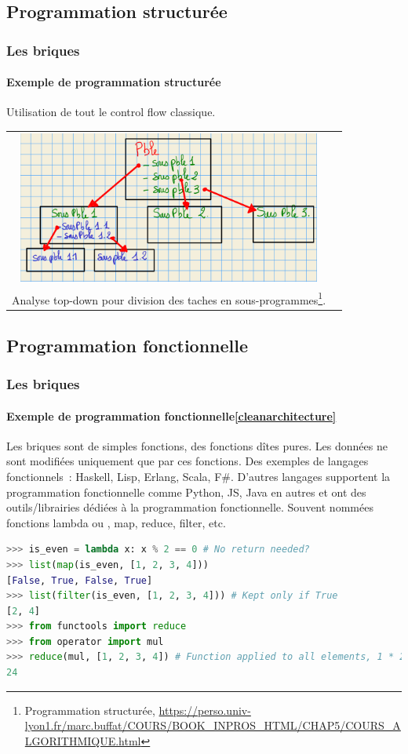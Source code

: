 \documentclass{beamer}
\begin{document}
    \subsection{Programmation structurée}\label{subsec:briques-struct}
    \begin{frame}
        \transdissolve
        \frametitle{Les briques}
        \framesubtitle{Exemple de programmation structurée}
        Utilisation de tout le control flow classique.
        \bigbreak
        \centering
        \begin{tabular}{cc}
            \includegraphics[width=10cm]{image/analyse-topdown-prog-struc}                                                                                                                                        \\
            Analyse top-down pour division des taches en sous-programmes\footnote{Programmation structurée, \url{https://perso.univ-lyon1.fr/marc.buffat/COURS/BOOK_INPROS_HTML/CHAP5/COURS_ALGORITHMIQUE.html}}.                     \\
        \end{tabular}
    \end{frame}

    \subsection{Programmation fonctionnelle}\label{subsec:briques-fonc}
    \begin{frame}[fragile]
        \transdissolve
        \frametitle{Les briques}
        \framesubtitle{Exemple de programmation fonctionnelle\cref{cleanarchitecture}}
        Les briques sont de simples fonctions, des fonctions dîtes pures.
        Les données ne sont modifiées uniquement que par ces fonctions.
        \bigbreak
        Des exemples de langages fonctionnels~: Haskell, Lisp, Erlang, Scala, F\#.
        \bigbreak
        D'autres langages supportent la programmation fonctionnelle comme Python, JS, Java en autres et ont des outils/librairies dédiées à la programmation fonctionnelle.
        Souvent nommées fonctions lambda ou , map, reduce, filter, etc.
        \begin{lstlisting}[language=python]
>>> is_even = lambda x: x % 2 == 0 # No return needed?
>>> list(map(is_even, [1, 2, 3, 4]))
[False, True, False, True]
>>> list(filter(is_even, [1, 2, 3, 4])) # Kept only if True
[2, 4]
>>> from functools import reduce
>>> from operator import mul
>>> reduce(mul, [1, 2, 3, 4]) # Function applied to all elements, 1 * 2 * 3 * 4
24
        \end{lstlisting}
    \end{frame}
\end{document}
